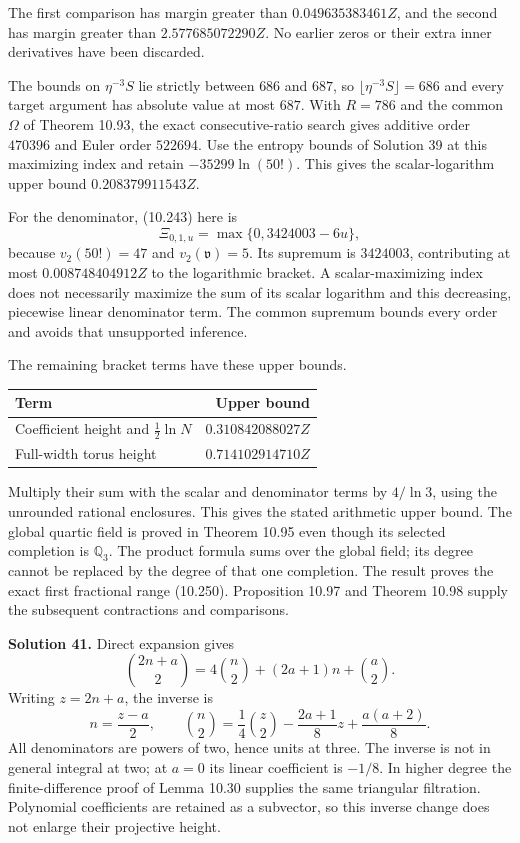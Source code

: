 \documentclass[
  11pt,
  a4paper,
]{article}
\newcounter{none} %
\begin{document}
The first comparison has margin greater than \(0.049635383461Z\), and
the second has margin greater than \(2.577685072290Z\). No earlier zeros
or their extra inner derivatives have been discarded.

The bounds on \(\eta^{-3}S\) lie strictly between \(686\) and \(687\),
so \(\lfloor\eta^{-3}S\rfloor=686\) and every target argument has
absolute value at most \(687\). With \(R=786\) and the common \(\Omega\)
of Theorem 10.93, the exact consecutive-ratio search gives additive
order \(470396\) and Euler order \(522694\). Use the entropy bounds of
Solution 39 at this maximizing index and retain \(-35299\ln(50!)\). This
gives the scalar-logarithm upper bound \(0.208379911543Z\).

For the denominator, (10.243) here is \[
\Xi_{0,1,u}=\max\{0,3424003-6u\},
\] because \(v_2(50!)=47\) and \(v_2(\mathfrak v)=5\). Its supremum is
\(3424003\), contributing at most \(0.008748404912Z\) to the logarithmic
bracket. A scalar-maximizing index does not necessarily maximize the sum
of its scalar logarithm and this decreasing, piecewise linear
denominator term. The common supremum bounds every order and avoids that
unsupported inference.

The remaining bracket terms have these upper bounds.

{\def\LTcaptype{none} %
\begin{longtable}[]{@{}lr@{}}
\toprule\noalign{}
Term & Upper bound \\
\midrule\noalign{}
\endhead
\bottomrule\noalign{}
\endlastfoot
Coefficient height and \(\tfrac12\ln N\) & \(0.310842088027Z\) \\
Full-width torus height & \(0.714102914710Z\) \\
\end{longtable}
}

Multiply their sum with the scalar and denominator terms by \(4/\ln3\),
using the unrounded rational enclosures. This gives the stated
arithmetic upper bound. The global quartic field is proved in Theorem
10.95 even though its selected completion is \(\mathbb Q_3\). The
product formula sums over the global field; its degree cannot be
replaced by the degree of that one completion. The result proves the
exact first fractional range (10.250). Proposition 10.97 and Theorem
10.98 supply the subsequent contractions and comparisons.

\textbf{Solution 41.} Direct expansion gives \[
\binom{2n+a}{2}=4\binom n2+(2a+1)n+\binom a2.
\] Writing \(z=2n+a\), the inverse is \[
n=\frac{z-a}{2},\qquad
\binom n2=\frac14\binom z2-\frac{2a+1}{8}z+\frac{a(a+2)}8.
\] All denominators are powers of two, hence units at three. The inverse
is not in general integral at two; at \(a=0\) its linear coefficient is
\(-1/8\). In higher degree the finite-difference proof of Lemma 10.30
supplies the same triangular filtration. Polynomial coefficients are
retained as a subvector, so this inverse change does not enlarge their
projective height.
\end{document}
